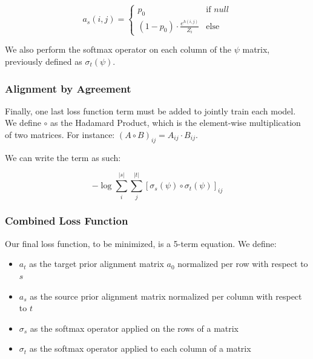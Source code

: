 \documentclass[twoside,twocolumn]{article}
\begin{document}
\begin{equation}
a_s (i, j) =
\begin{cases}
      p_0 & \text{if } null \\
     (1-p_0) \cdot \frac{e^{h(i,j)}}{Z_i} & \text{else}
   \end{cases}
\end{equation}

We also perform the softmax operator on each column of the $\psi$ matrix,
previously defined as $\sigma_t(\psi)$.


\subsubsection{Alignment by Agreement}

Finally, one last loss function term must be added to jointly train each model.
We define $\circ$ as the Hadamard Product, which is the element-wise
multiplication of two matrices. For instance:
$(A \circ B)_{ij} = A_{ij} \cdot B_{ij}$.

We can write the term as such:

\begin{equation}
  -\log \sum_i^{|s|} \sum_j^{|t|}
    \left[ \sigma_s(\psi) \circ \sigma_t(\psi) \right]_{ij}
\end{equation}



\subsubsection{Combined Loss Function}

Our final loss function, to be minimized, is a 5-term equation. We define:
\begin{itemize}[label={}]
  \item $a_t$ as the target prior alignment matrix $a_0$ normalized per row with respect to $s$\\
  \item $a_s$ as the source prior alignment matrix normalized per column with respect to $t$\\
  \item $\sigma_s$ as the softmax operator applied on the rows of a matrix\\
  \item $\sigma_t$ as the softmax operator applied to each column of a matrix
\end{itemize}
\end{document}
